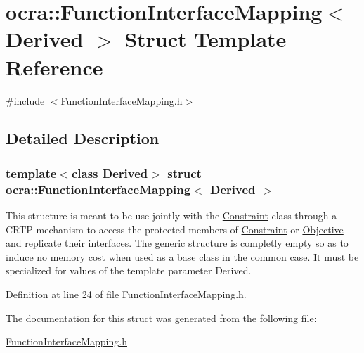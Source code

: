 \hypertarget{structocra_1_1FunctionInterfaceMapping}{}\section{ocra\+:\+:Function\+Interface\+Mapping$<$ Derived $>$ Struct Template Reference}
\label{structocra_1_1FunctionInterfaceMapping}


{\ttfamily \#include $<$Function\+Interface\+Mapping.\+h$>$}



\subsection{Detailed Description}
\subsubsection*{template$<$class Derived$>$\newline
struct ocra\+::\+Function\+Interface\+Mapping$<$ Derived $>$}

This structure is meant to be use jointly with the \hyperlink{classocra_1_1Constraint}{Constraint} class through a C\+R\+TP mechanism to access the protected members of \hyperlink{classocra_1_1Constraint}{Constraint} or \hyperlink{classocra_1_1Objective}{Objective} and replicate their interfaces. The generic structure is completly empty so as to induce no memory cost when used as a base class in the common case. It must be specialized for values of the template parameter Derived. 

Definition at line 24 of file Function\+Interface\+Mapping.\+h.



The documentation for this struct was generated from the following file\+:\begin{DoxyCompactItemize}
\item 
\hyperlink{FunctionInterfaceMapping_8h}{Function\+Interface\+Mapping.\+h}\end{DoxyCompactItemize}
